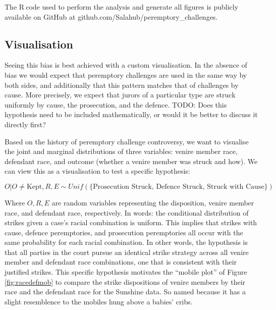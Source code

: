 \documentclass[12pt]{article}
\newcommand*{\R}{\textsf{R}$~$}
\newcommand{\TODO}[1]{{\color{brickred} TODO:  {#1}}}
\begin{document}
The \R code used to perform the analysis and generate all figures is publicly available on GitHub at github.com/Salahub/peremptory\_challenges.

\subsection{Visualisation}

Seeing this bias is best achieved with a custom visualisation. In the absence of bias we would expect that peremptory challenges are used in the same way by both sides, and additionally that this pattern matches that of challenges by cause. More precisely, we expect that jurors of a particular type are struck uniformly by cause, the prosecution, and the defence.
\TODO{Does this hypothesis need to be included mathematically, or would it be better to discuss it directly first?}

Based on the history of peremptory challenge controversy, we want to visualise the joint and marginal distributions of three variables: venire member race, defendant race, and outcome (whether a venire member was struck and how). We can view this as a visualisation to test a specific hypothesis:

\begin{equation}
  \label{eq:vishyp}
  O | O \neq \text{Kept}, R, E \sim Unif(\{\text{Prosecution
    Struck, Defence Struck, Struck with Cause}\})
\end{equation}

Where $O, R, E$ are random variables representing the disposition, venire member race, and defendant race, respectively. In words: the conditional distribution of strikes given a case's racial combination is uniform. This implies that strikes with cause, defence peremptories, and prosecution peremptories all occur with the same probability for each racial combination. In other words, the hypothesis is that all parties in the court pursue an identical strike strategy across all venire member and defendant race combinations, one that is consistent with their justified strikes. This specific hypothesis motivates the ``mobile plot'' of Figure \ref{fig:racedefmob} to compare the strike dispositions of venire members by their race and the defendant race for the Sunshine data. So named because it has a slight resemblence to the mobiles hung above a babies' cribs.
\end{document}
